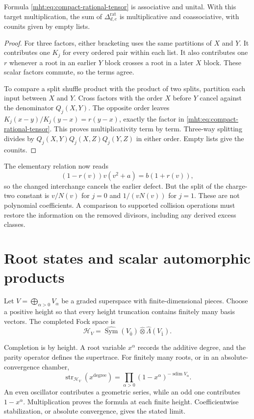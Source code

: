\begin{proposition}\label{mht:prop:compact-rational-cooperation}
Formula \eqref{mht:eq:compact-rational-tensor} is associative and
unital. With this target multiplication, the sum of
$\Delta_{d,e}^{\mathrm{rat}}$ is multiplicative and coassociative,
with counits given by empty lists.
\end{proposition}

\begin{proof}
For three factors, either bracketing uses the same partitions of
$X$ and $Y$. It contributes one $K_j$ for every ordered pair within
each list. It also contributes one $r$ whenever a root in an earlier
$Y$ block crosses a root in a later $X$ block.
These scalar factors commute, so the
terms agree.

To compare a split shuffle product with the product of two splits,
partition each input between $X$ and $Y$. Cross factors with the
order $X$ before $Y$ cancel against the denominator $Q_j(X,Y)$.
The opposite order leaves $K_j(x-y)/K_j(y-x)=r(y-x)$, exactly the
factor in \eqref{mht:eq:compact-rational-tensor}. This proves
multiplicativity term by term. Three-way splitting divides by
$Q_j(X,Y)Q_j(X,Z)Q_j(Y,Z)$ in either order. Empty lists give the
counits.
\end{proof}

The elementary relation now reads
\[
 (1-r(v))v(v^2+a)=b(1+r(v)),
\]
so the changed interchange cancels the earlier defect. But the split
of the charge-two constant is $v/N(v)$ for $j=0$ and $1/(vN(v))$
for $j=1$. These are not polynomial coefficients. A comparison to
supported collision operations must restore the information on the
removed divisors, including any derived excess classes.

\section{Root states and scalar automorphic products}

Let $V=\bigoplus_{\alpha>0}V_\alpha$ be a graded superspace with
finite-dimensional pieces. Choose a positive height so that every
height truncation contains finitely many basis vectors. The completed
Fock space is
\[
 \mathcal H_V=\widehat{\operatorname{Sym}}(V_{\bar0})
                  \widehat\otimes\widehat\Lambda(V_{\bar1}).
\]

Completion is by height. A root variable $x^\alpha$ records the
additive degree, and the parity operator defines the supertrace.
For finitely many roots, or in an absolute-convergence chamber,
\begin{equation}\label{mht:eq:compact-fock-character}
 \operatorname{str}_{\mathcal H_V}(x^{\mathrm{degree}})
       =\prod_{\alpha>0}(1-x^\alpha)^{-\operatorname{sdim}V_\alpha}.
\end{equation}
An even oscillator contributes a geometric series, while an odd one
contributes $1-x^\alpha$. Multiplication proves the formula at each
finite height. Coefficientwise stabilization, or absolute convergence,
gives the stated limit.

